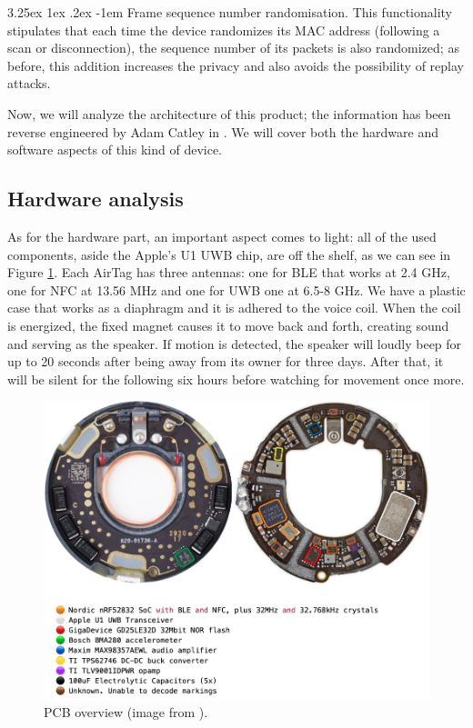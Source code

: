 \documentclass[english]{article}
\makeatletter
\renewcommand\paragraph{\@startsection{paragraph}{5}{\z@}%
  {3.25ex \@plus1ex \@minus.2ex}%
  {-1em}%
  {\normalfont\normalsize\bfseries}}
\makeatother
\begin{document}
\paragraph{Frame sequence number randomisation.}
This functionality stipulates that each time the device randomizes its MAC address (following a scan or disconnection), the sequence number of its packets is also randomized; as before, this addition increases the privacy and also avoids the possibility of replay attacks.


Now, we will analyze the architecture of this product; the information has been reverse engineered by Adam Catley in \cite{reverse}. We will cover both the hardware and software aspects of this kind of device.

\subsection{Hardware analysis}\label{hw}
As for the hardware part, an important aspect comes to light: all of the used components, aside the Apple's U1 UWB chip, are off the shelf, as we can see in Figure \ref{img:pcb}.
Each AirTag has three antennas: one for BLE that works at 2.4 GHz, one for NFC at 13.56 MHz and one for UWB one at 6.5-8 GHz.
We have a plastic case that works as a diaphragm and it is adhered to the voice coil. When the coil is energized, the fixed magnet causes it to move back and forth, creating sound and serving as the speaker.
If motion is detected, the speaker will loudly beep for up to 20 seconds after being away from its owner for three days. After that, it will be silent for the following six hours before watching for movement once more.
\begin{figure}[ht]
	\centering
	\includegraphics[width=\textwidth]{images/pcb.png}
	\caption{PCB overview (image from \cite{reverse}). }
	\label{img:pcb}
\end{figure}
\end{document}
